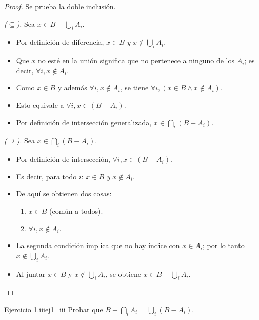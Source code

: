 \documentclass[11pt, a4paper]{article}
\begin{document}
\begin{proof}
Se prueba la doble inclusión.

\textit{($\subseteq$).} Sea $x \in B - \bigcup_{i} A_i$.
\begin{itemize}
    \item Por definición de diferencia, $x \in B$ \emph{y} $x \notin \bigcup_{i} A_i$.
    \item Que $x$ no esté en la unión significa que no pertenece a ninguno de los $A_i$; es decir,
    $\forall i, x \notin A_i$.
    \item Como $x \in B$ y además $\forall i, x \notin A_i$, se tiene
    $\forall i, (x \in B \land x \notin A_i)$.
    \item Esto equivale a $\forall i, x \in (B - A_i)$.
    \item Por definición de intersección generalizada, $x \in \bigcap_{i} (B - A_i)$.
\end{itemize}

\textit{($\supseteq$).} Sea $x \in \bigcap_{i} (B - A_i)$.
\begin{itemize}
    \item Por definición de intersección, $\forall i, x \in (B - A_i)$.
    \item Es decir, para todo $i$: $x \in B$ \emph{y} $x \notin A_i$.
    \item De aquí se obtienen dos cosas:
    \begin{enumerate}
        \item $x \in B$ (común a todos).
        \item $\forall i, x \notin A_i$.
    \end{enumerate}
    \item La segunda condición implica que no hay índice con $x \in A_i$; por lo tanto
    $x \notin \bigcup_{i} A_i$.
    \item Al juntar $x \in B$ y $x \notin \bigcup_{i} A_i$, se obtiene $x \in B - \bigcup_{i} A_i$.
\end{itemize}
\end{proof}

\begin{proposicion}{Ejercicio 1.iii}{ej1_iii}
Probar que $B - \bigcap_{i} A_i = \bigcup_{i} (B - A_i)$.
\end{proposicion}
\end{document}
